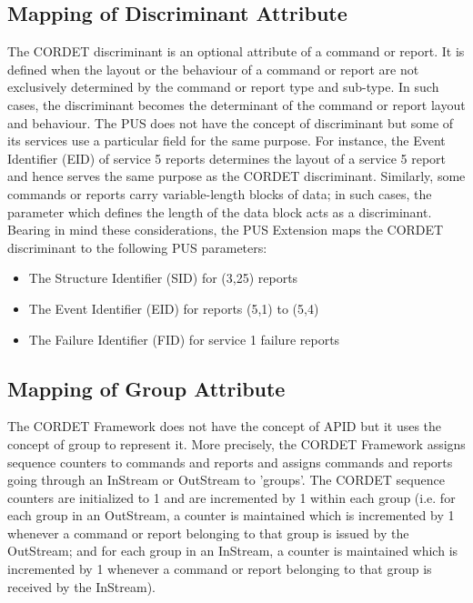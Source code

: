 \documentclass{pnp_article}
\begin{document}
\subsection{Mapping of Discriminant Attribute}\label{sec:mapDisc}
The CORDET discriminant is an optional attribute of a command or report. It is defined when the layout or the behaviour of a command or report are not exclusively determined by the command or report type and sub-type. In such cases, the discriminant becomes the determinant of the command or report layout and behaviour. The PUS does not have the concept of discriminant but some of its services use a particular field for the same purpose. For instance, the Event Identifier (EID) of service 5 reports determines the layout of a service 5 report and hence serves the same purpose as the CORDET discriminant. Similarly, some commands or reports carry variable-length blocks of data; in such cases, the parameter which defines the length of the data block acts as a discriminant. Bearing in mind these considerations, the PUS Extension maps the CORDET discriminant to the following PUS parameters:

\begin{itemize}
\item The Structure Identifier (SID) for (3,25) reports
\item The Event Identifier (EID) for reports (5,1) to (5,4)
\item The Failure Identifier (FID) for service 1 failure reports
\end{itemize}

\subsection{Mapping of Group Attribute}\label{sec:mapGroup}
The CORDET Framework does not have the concept of APID but it uses the concept of group to represent it. More precisely, the CORDET Framework assigns sequence counters to commands and reports and assigns commands and reports going through an InStream or OutStream to 'groups'. The CORDET sequence counters are initialized to 1 and are incremented by 1 within each group (i.e. for each group in an OutStream, a counter is maintained which is incremented by 1 whenever a command or report belonging to that group is issued by the OutStream; and for each group in an InStream, a counter is maintained which is incremented by 1 whenever a command or report belonging to that group is received by the InStream). 
\end{document}
